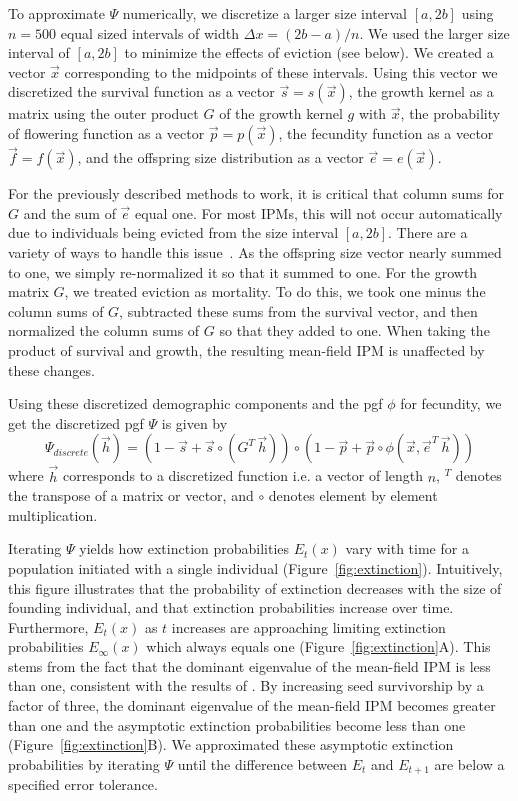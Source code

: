 \documentclass[12pt]{amsart}\usepackage[]{graphicx}\usepackage[]{color}
\begin{document}
To approximate $\Psi$ numerically, we discretize a larger size interval $[a,2b]$ using $n=500$ equal sized intervals of width $\Delta x=(2b-a)/n$. We used the larger size interval of $[a,2b]$ to minimize the effects of eviction (see below). We created a vector $\vec x$ corresponding to the midpoints of these intervals. Using this vector we discretized the survival function as a vector $\vec s=s(\vec x)$, the growth kernel as a matrix using the outer product $G$ of the growth kernel $g$ with $\vec x$, the probability of flowering function as a vector $\vec p=p(\vec x)$, the fecundity function as a vector $\vec f=f(\vec x)$, and the offspring size distribution as a vector $\vec e=e(\vec x)$.

For the previously described methods to work, it is critical that column sums for $G$ and the sum of $\vec e$ equal one. For most IPMs, this will not occur automatically due to individuals being evicted from the size interval $[a,2b]$. There are a variety of ways to handle this issue~\citep{williams-etal-12}. As the offspring size vector nearly summed to one,  we simply re-normalized it so that it summed to one. For the growth matrix $G$, we treated eviction as mortality. To do this, we took one minus the column sums of $G$, subtracted these sums from the survival vector, and then normalized the column sums of $G$ so that they added to one. When taking the product of survival and growth, the resulting mean-field IPM is unaffected by these changes.

Using these discretized demographic components and the pgf $\phi$ for fecundity, we get the discretized pgf $\Psi$ is given by
\[
\Psi_{discrete}(\vec h)=(1-\vec s+\vec s\circ (G^T\, \vec h))\circ(1-\vec p+\vec p\circ \phi(\vec x,\vec e^T\,\vec h))
\]
where $\vec h$ corresponds to a discretized function i.e. a vector of length $n$, $^T$ denotes the transpose of a matrix or vector,  and $\circ$ denotes element by element multiplication.





Iterating $\Psi$ yields how extinction probabilities $E_t(x)$ vary with time for a population initiated with a single individual (Figure~\ref{fig:extinction}). Intuitively, this figure illustrates that the probability of extinction decreases with the size of founding individual, and that extinction probabilities increase over time. Furthermore, $E_t(x)$ as $t$ increases are approaching limiting extinction probabilities $E_{\infty}(x)$ which always equals one (Figure~\ref{fig:extinction}A). This stems from the fact that the dominant eigenvalue of the mean-field IPM is less than one, consistent with the results of \citet{salguero-etal-12}. By increasing seed survivorship by a factor of three, the dominant eigenvalue of the mean-field IPM becomes greater than one and the asymptotic extinction probabilities become less than one (Figure~\ref{fig:extinction}B). We approximated these asymptotic extinction probabilities  by iterating $\Psi$ until the difference between $E_t$ and $E_{t+1}$ are below a specified error tolerance.
\end{document}
